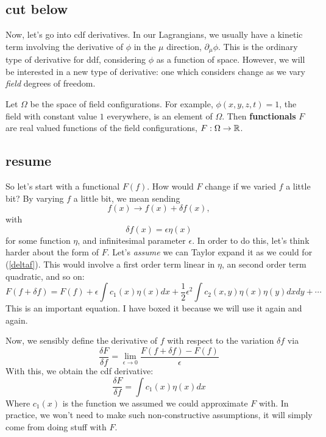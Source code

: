 \documentclass{book}
\begin{document}
\subsection{cut below}
Now, let's go into cdf derivatives. In our Lagrangians, we usually have a kinetic term involving the derivative of $\phi$ in the $\mu$ direction, $\partial_\mu \phi$. This is the ordinary type of derivative for ddf, considering $\phi$ as a function of space. However, we will be interested in a new type of derivative: one which considers change as we vary \textit{field} degrees of freedom.

Let $\Omega$ be the space of field configurations. For example, $\phi(x,y,z,t) = 1$, the field with constant value $1$ everywhere, is an element of $\Omega$. Then \textbf{functionals} $F$ are real valued functions of the field configurations, $F:\Omega \to \mathbb{R}$. 
\subsection{resume}
So let's start with a functional $F(f)$. How would $F$ change if we varied $f$ a little bit? By varying $f$ a little bit, we mean sending
\[
f(x) \to f(x) + \delta f(x),
\]
with
\[
\delta f(x) = \epsilon \eta (x)
\]
for some function $\eta$, and infinitesimal parameter $\epsilon$. In order to do this, let's think harder about the form of $F$. Let's \textit{assume} we can Taylor expand it as we could for (\ref{deltaf}). This would involve a first order term linear in $\eta$, an second order term quadratic, and so on:
\begin{equation} \label{taylorF}
\boxed{F(f + \delta f) = F(f) + \epsilon \int c_1(x) \eta(x) dx + \frac{1}{2} \epsilon^2 \int c_2 (x,y) \eta(x) \eta(y) dx dy + \cdots}
\end{equation}
This is an important equation. I have boxed it because we will use it again and again.

Now, we sensibly define the derivative of $f$ with respect to the variation $\delta f$ via
\[
\frac{\delta F}{\delta f} = \lim_{\epsilon \to 0} \frac{F(f + \delta f) - F(f)}{\epsilon}
\]
With this, we obtain the cdf derivative:
\begin{equation} \label{delta F}
\frac{\delta F}{\delta f} = \int c_1 (x) \eta (x) dx
\end{equation}
Where $c_1 (x)$ is the function we assumed we could approximate $F$ with. In practice, we won't need to make such non-constructive assumptions, it will simply come from doing stuff with $F$. 
\end{document}
